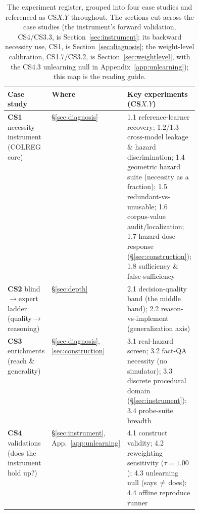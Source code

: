 \documentclass{article}
\begin{document}
\begin{table}[t]
\centering\small
\begin{tabular}{@{}llp{0.44\linewidth}@{}}
\toprule
Case study & Where & Key experiments (CS$X.Y$) \\
\midrule
\textbf{CS1} necessity instrument (COLREG core) & \S\ref{sec:diagnosis} &
1.1 reference-learner recovery; 1.2/1.3 cross-model leakage \& hazard discrimination;
1.4 geometric hazard suite (necessity as a fraction); 1.5 redundant-vs-unusable;
1.6 corpus-value audit/localization; 1.7 hazard dose-response
(\S\ref{sec:construction}); 1.8 sufficiency \& false-sufficiency \\
\addlinespace
\textbf{CS2} blind$\to$expert ladder (quality$\to$reasoning) & \S\ref{sec:depth} &
2.1 decision-quality band (the middle band); 2.2 reason-vs-implement (generalization axis) \\
\addlinespace
\textbf{CS3} enrichments (reach \& generality) & \S\ref{sec:diagnosis},\,\ref{sec:construction} &
3.1 real-hazard screen; 3.2 fact-QA necessity (no simulator); 3.3 discrete procedural domain
(\S\ref{sec:instrument}); 3.4 probe-suite breadth \\
\addlinespace
\textbf{CS4} validations (does the instrument hold up?) & \S\ref{sec:instrument},\,App.~\ref{app:unlearning} &
4.1 construct validity; 4.2 reweighting sensitivity ($\tau{=}1.00$); 4.3 unlearning null
(says\,$\neq$\,does); 4.4 offline reproduce runner \\
\bottomrule
\end{tabular}
\caption{The experiment register, grouped into four case studies and referenced as CS$X.Y$
throughout. The sections cut across the case studies (the instrument's forward validation, CS4/CS3.3,
is Section~\ref{sec:instrument}; its backward necessity use, CS1, is Section~\ref{sec:diagnosis}; the
weight-level calibration, CS1.7/CS3.2, is Section~\ref{sec:weightlevel}, with the CS4.3 unlearning null in
Appendix~\ref{app:unlearning}); this map is the reading guide.}
\label{tab:casemap}
\end{table}
\end{document}

